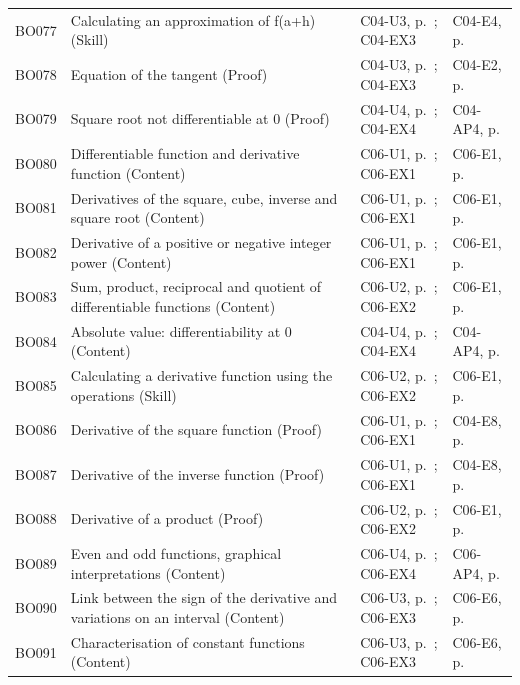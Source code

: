 \begin{longtable}{p{.1\linewidth}p{.43\linewidth}p{.19\linewidth}p{.16\linewidth}}
BO077 & Calculating an approximation of f(a+h) (Skill) & C04-U3, p.\,\pageref{C04-U3} ; C04-EX3 & C04-E4, p.\,\pageref{C04-E4} \\
BO078 & Equation of the tangent (Proof) & C04-U3, p.\,\pageref{C04-U3} ; C04-EX3 & C04-E2, p.\,\pageref{C04-E2} \\
BO079 & Square root not differentiable at 0 (Proof) & C04-U4, p.\,\pageref{C04-U4} ; C04-EX4 & C04-AP4, p.\,\pageref{C04-AP4} \\
BO080 & Differentiable function and derivative function (Content) & C06-U1, p.\,\pageref{C06-U1} ; C06-EX1 & C06-E1, p.\,\pageref{C06-E1} \\
BO081 & Derivatives of the square, cube, inverse and square root (Content) & C06-U1, p.\,\pageref{C06-U1} ; C06-EX1 & C06-E1, p.\,\pageref{C06-E1} \\
BO082 & Derivative of a positive or negative integer power (Content) & C06-U1, p.\,\pageref{C06-U1} ; C06-EX1 & C06-E1, p.\,\pageref{C06-E1} \\
BO083 & Sum, product, reciprocal and quotient of differentiable functions (Content) & C06-U2, p.\,\pageref{C06-U2} ; C06-EX2 & C06-E1, p.\,\pageref{C06-E1} \\
BO084 & Absolute value: differentiability at 0 (Content) & C04-U4, p.\,\pageref{C04-U4} ; C04-EX4 & C04-AP4, p.\,\pageref{C04-AP4} \\
BO085 & Calculating a derivative function using the operations (Skill) & C06-U2, p.\,\pageref{C06-U2} ; C06-EX2 & C06-E1, p.\,\pageref{C06-E1} \\
BO086 & Derivative of the square function (Proof) & C06-U1, p.\,\pageref{C06-U1} ; C06-EX1 & C04-E8, p.\,\pageref{C04-E8} \\
BO087 & Derivative of the inverse function (Proof) & C06-U1, p.\,\pageref{C06-U1} ; C06-EX1 & C04-E8, p.\,\pageref{C04-E8} \\
BO088 & Derivative of a product (Proof) & C06-U2, p.\,\pageref{C06-U2} ; C06-EX2 & C06-E1, p.\,\pageref{C06-E1} \\
BO089 & Even and odd functions, graphical interpretations (Content) & C06-U4, p.\,\pageref{C06-U4} ; C06-EX4 & C06-AP4, p.\,\pageref{C06-AP4} \\
BO090 & Link between the sign of the derivative and variations on an interval (Content) & C06-U3, p.\,\pageref{C06-U3} ; C06-EX3 & C06-E6, p.\,\pageref{C06-E6} \\
BO091 & Characterisation of constant functions (Content) & C06-U3, p.\,\pageref{C06-U3} ; C06-EX3 & C06-E6, p.\,\pageref{C06-E6} \\

\end{longtable}
